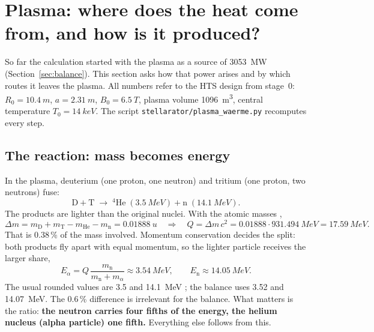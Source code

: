 \section{Plasma: where does the heat come from, and how is it produced?}\label{sec:plasma}

So far the calculation started with the plasma as a source of \SI{3053}{MW} (Section~\ref{sec:balance}). This section
asks how that power arises and by which routes it leaves the plasma. All numbers refer to the HTS design from stage~0:
$R_0 = \SI{10.4}{m}$, $a = \SI{2.31}{m}$, $B_0 = \SI{6.5}{T}$, plasma volume \SI{1096}{m^3}, central temperature
$T_0 = \SI{14}{keV}$. The script \texttt{stellarator/plasma\_waerme.py} recomputes every step.

\subsection{The reaction: mass becomes energy}
In the plasma, deuterium (one proton, one neutron) and tritium (one proton, two neutrons) fuse:
\[ \mathrm{D} + \mathrm{T} \;\rightarrow\; {}^4\mathrm{He}\;(\SI{3.5}{MeV}) + \mathrm{n}\;(\SI{14.1}{MeV}). \]
The products are lighter than the original nuclei. With the atomic masses \cite{ame2020},
\[ \Delta m = m_\mathrm{D} + m_\mathrm{T} - m_\mathrm{He} - m_\mathrm{n} = \SI{0.01888}{u}
   \quad\Rightarrow\quad Q = \Delta m\,c^2 = 0.01888 \cdot \SI{931.494}{MeV} = \SI{17.59}{MeV}. \]
That is 0.38\,\% of the mass involved. Momentum conservation decides the split: both products fly apart with equal
momentum, so the lighter particle receives the larger share,
\[ E_\alpha = Q\,\frac{m_\mathrm{n}}{m_\mathrm{n} + m_\alpha} \approx \SI{3.54}{MeV},\qquad E_\mathrm{n} \approx \SI{14.05}{MeV}. \]
The usual rounded values are \SI{3.5}{} and \SI{14.1}{MeV} \cite{wiki_tritium}; the balance uses \SI{3.52}{} and
\SI{14.07}{MeV}. The 0.6\,\% difference is irrelevant for the balance. What matters is the ratio: \textbf{the neutron
carries four fifths of the energy, the helium nucleus (alpha particle) one fifth.} Everything else follows from this.


